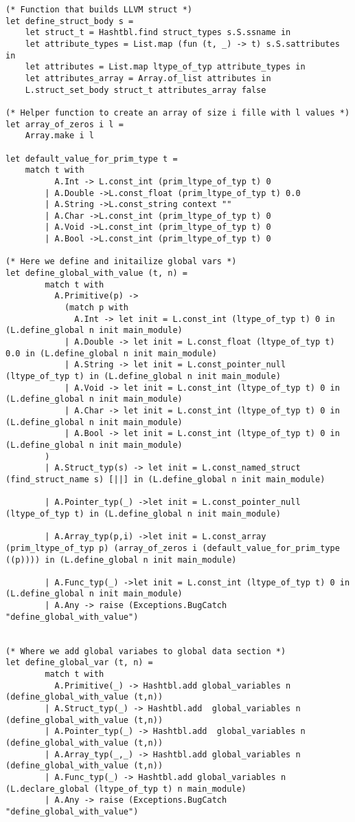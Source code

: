 \documentclass{article}
\begin{document}
\begin{lstlisting}
(* Function that builds LLVM struct *)
let define_struct_body s =
	let struct_t = Hashtbl.find struct_types s.S.ssname in
	let attribute_types = List.map (fun (t, _) -> t) s.S.sattributes in
	let attributes = List.map ltype_of_typ attribute_types in		
	let attributes_array = Array.of_list attributes in 
	L.struct_set_body struct_t attributes_array false

(* Helper function to create an array of size i fille with l values *)
let array_of_zeros i l = 
	Array.make i l

let default_value_for_prim_type t = 
	match t with 
		  A.Int -> L.const_int (prim_ltype_of_typ t) 0
		| A.Double ->L.const_float (prim_ltype_of_typ t) 0.0
		| A.String ->L.const_string context "" 
		| A.Char ->L.const_int (prim_ltype_of_typ t) 0
		| A.Void ->L.const_int (prim_ltype_of_typ t) 0
		| A.Bool ->L.const_int (prim_ltype_of_typ t) 0

(* Here we define and initailize global vars *)
let define_global_with_value (t, n) = 
		match t with 
		  A.Primitive(p) -> 
			(match p with
			  A.Int -> let init = L.const_int (ltype_of_typ t) 0 in (L.define_global n init main_module)
			| A.Double -> let init = L.const_float (ltype_of_typ t) 0.0 in (L.define_global n init main_module)
			| A.String -> let init = L.const_pointer_null (ltype_of_typ t) in (L.define_global n init main_module)		
			| A.Void -> let init = L.const_int (ltype_of_typ t) 0 in (L.define_global n init main_module)
			| A.Char -> let init = L.const_int (ltype_of_typ t) 0 in (L.define_global n init main_module)
			| A.Bool -> let init = L.const_int (ltype_of_typ t) 0 in (L.define_global n init main_module)
		)
		| A.Struct_typ(s) -> let init = L.const_named_struct (find_struct_name s) [||] in (L.define_global n init main_module)		

		| A.Pointer_typ(_) ->let init = L.const_pointer_null (ltype_of_typ t) in (L.define_global n init main_module)		

		| A.Array_typ(p,i) ->let init = L.const_array (prim_ltype_of_typ p) (array_of_zeros i (default_value_for_prim_type ((p)))) in (L.define_global n init main_module)		

		| A.Func_typ(_) ->let init = L.const_int (ltype_of_typ t) 0 in (L.define_global n init main_module)		
		| A.Any -> raise (Exceptions.BugCatch "define_global_with_value")


(* Where we add global variabes to global data section *)
let define_global_var (t, n) =
		match t with
		  A.Primitive(_) -> Hashtbl.add global_variables n (define_global_with_value (t,n))
		| A.Struct_typ(_) -> Hashtbl.add  global_variables n (define_global_with_value (t,n))
		| A.Pointer_typ(_) -> Hashtbl.add  global_variables n (define_global_with_value (t,n))
		| A.Array_typ(_,_) -> Hashtbl.add global_variables n (define_global_with_value (t,n))
		| A.Func_typ(_) -> Hashtbl.add global_variables n (L.declare_global (ltype_of_typ t) n main_module)
		| A.Any -> raise (Exceptions.BugCatch "define_global_with_value")


\end{lstlisting}
\end{document}
